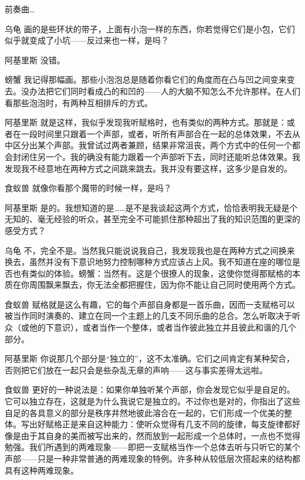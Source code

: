 \begin{dialog}{前奏曲…}
\begin{dialogue}
\item[乌龟]画的是些环状的带子，上面有小泡一样的东西，你若觉得它们是小包，它们似乎就变成了小坑——反过来也一样，是吗？

\item[阿基里斯]没错。

\item[螃蟹]我记得那幅画。那些小泡泡总是随着你看它们的角度而在凸与凹之间变来变去。没办法把它们同时看成凸的和凹的——人的大脑不知怎么不允许那样。在人们看那些泡泡时，有两种互相排斥的方式。

\item[阿基里斯]就是这样，我似乎发现我听赋格时，也有类似的两种方式。那就是：或者在一段时间里只跟着一个声部，或者，听所有声部合在一起的总体效果，不去从中区分出某个声部。我曾试过两者兼顾，结果非常沮丧，两个方式中的任何一个都会封闭住另一个。我的确没有能力跟着一个声部听下去，同时还能听总体效果。我发现我不经意地在两种方式之间跳来跳去。我并没有要这样，这多少是自发的。

\item[食蚁兽]就像你看那个魔带的时候一样，是吗？

\item[阿基里斯]是的。我想知道的是……是不是我谈起这两个方式，恰恰表明我无疑是个无知的、毫无经验的听众，甚至完全不可能抓住那种超出了我的知识范围的更深的感受方式？

\item[乌龟]不，完全不是。当然我只能说说我自己，我发现我也是在两种方式之间换来换去，虽然并没有下意识地努力控制哪种方式应该占上风。我不知道在座的哪位是否也有类似的体验。螃蟹：当然有。这是个很撩人的现象，这使你觉得那赋格的本质在你周围飘来飘去，你无法全都把握住，因为你不能让自己同时使用两个方式。

\item[食蚁兽]赋格就是这么有趣，它的每个声部自身都是一首乐曲，因而一支赋格可以被当作同时演奏的、建立在同一个主题上的几支不同乐曲的总合。怎么听取决于听众（或他的下意识），或者当作一个整体，或者当作彼此独立并且彼此和谐的几个部分。

\item[阿基里斯]你说那几个部分是“独立的”，这不太准确。它们之间肯定有某种契合，否则把它们放在一起只会是些杂乱无章的声响——这与事实差得太远啦。

\item[食蚁兽]更好的一种说法是：如果你单独听某个声部，你会发现它似乎是自足的。它可以独立存在，这就是为什么我说它是独立的。不过你也是对的，你指出了这些自足的各具意义的部分是秩序井然地彼此溶合在一起的，它们形成一个优美的整体。写出好赋格正是来自这种能力：使听众觉得有几支不同的旋律，每支旋律都好像是由于其自身的美而被写出来的，然而放到一起形成一个总体时，一点也不觉得勉强。我们所遇到的两难现象——即把一支赋格当作一个总体去听与只听它的某个声部——只是一种非常普通的两难现象的特例。许多种从较低层次搭起来的结构都具有这种两难现象。


\end{dialogue}
\end{dialog}
